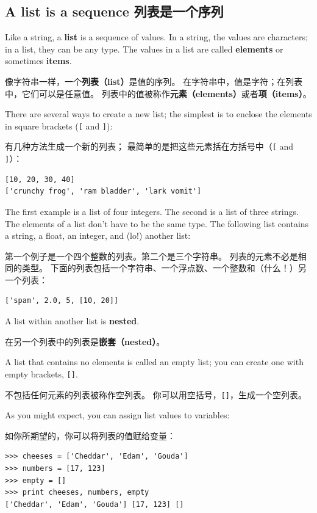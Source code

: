 \documentclass[10pt]{book}
\begin{document}
\begin{CJK}{UTF8}{gbsn}
\section{A list is a sequence 列表是一个序列}
\label{sequence}

Like a string, a {\bf list} is a sequence of values.  In a string, the
values are characters; in a list, they can be any type.  The values in
a list are called {\bf elements} or sometimes {\bf items}.

像字符串一样，一个{\bf 列表（list）}是值的序列。
在字符串中，值是字符；在列表中，它们可以是任意值。
列表中的值被称作{\bf 元素（elements）}或者{\bf 项（items）}。

There are several ways to create a new list; the simplest is to
enclose the elements in square brackets (\verb"[" and \verb"]"):

有几种方法生成一个新的列表；
最简单的是把这些元素括在方括号中（\verb"[" and \verb"]"）：

\begin{verbatim}
[10, 20, 30, 40]
['crunchy frog', 'ram bladder', 'lark vomit']
\end{verbatim}
%
The first example is a list of four integers.  The second is a list of
three strings.  The elements of a list don't have to be the same type.
The following list contains a string, a float, an integer, and
(lo!) another list:

第一个例子是一个四个整数的列表。第二个是三个字符串。
列表的元素不必是相同的类型。
下面的列表包括一个字符串、一个浮点数、一个整数和（什么！）另一个列表：

\begin{verbatim}
['spam', 2.0, 5, [10, 20]]
\end{verbatim}
%
A list within another list is {\bf nested}.

在另一个列表中的列表是{\bf 嵌套（nested）}。

A list that contains no elements is
called an empty list; you can create one with empty
brackets, \verb"[]".

不包括任何元素的列表被称作空列表。
你可以用空括号，\verb"[]"，生成一个空列表。

As you might expect, you can assign list values to variables:

如你所期望的，你可以将列表的值赋给变量：

\begin{verbatim}
>>> cheeses = ['Cheddar', 'Edam', 'Gouda']
>>> numbers = [17, 123]
>>> empty = []
>>> print cheeses, numbers, empty
['Cheddar', 'Edam', 'Gouda'] [17, 123] []
\end{verbatim}
%



\end{CJK}
\end{document}
